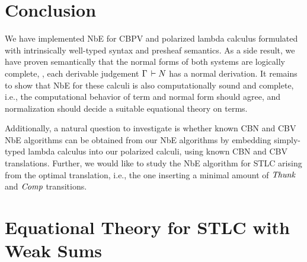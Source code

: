 \documentclass[a4paper,USenglish,cleveref, autoref]{lipics-v2019}
\begin{document}
\section{Conclusion}
\label{sec:concl}

We have implemented NbE for CBPV and polarized lambda calculus
formulated with intrinsically well-typed syntax and presheaf
semantics.  As a side result, we have proven semantically
that the normal forms of both systems are logically complete, \ie,
each derivable judgement $\Gamma \,\vdash N$ has a normal derivation.
It remains to show that NbE for these calculi is also computationally
sound and complete, i.e., the computational behavior of term and
normal form should agree, and normalization should decide a suitable
equational theory on terms.

Additionally, a natural question to investigate is whether known CBN
and CBV NbE algorithms can be obtained from our NbE algorithms by
embedding simply-typed lambda calculus into our polarized calculi,
using known CBN and CBV translations.  Further, we would like to study
the NbE algorithm for STLC arising from the optimal translation, i.e.,
the one inserting a minimal amount of $\mathit{Thunk}$ and $\mathit{Comp}$ transitions.



\appendix

\section{Equational Theory for STLC with Weak Sums}
\label{sec:eq}
\end{document}
